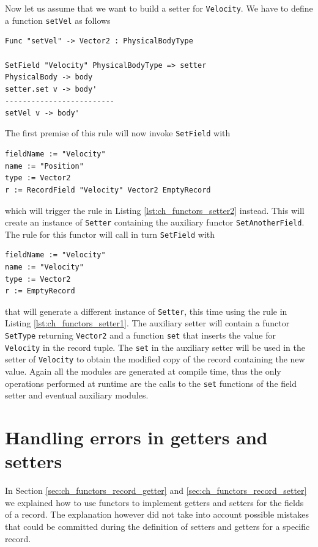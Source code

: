 \noindent
Now let us assume that we want to build a setter for \texttt{Velocity}. We have to define a function \texttt{setVel} as follows

\begin{lstlisting}
Func "setVel" -> Vector2 : PhysicalBodyType

SetField "Velocity" PhysicalBodyType => setter
PhysicalBody -> body
setter.set v -> body'
-------------------------
setVel v -> body'
\end{lstlisting}

\noindent
The first premise of this rule will now invoke \texttt{SetField} with

\begin{lstlisting}
fieldName := "Velocity"
name := "Position"
type := Vector2
r := RecordField "Velocity" Vector2 EmptyRecord
\end{lstlisting}

\noindent
which will trigger the rule in Listing \ref{lst:ch_functors_setter2} instead. This will create an instance of \texttt{Setter} containing  the auxiliary functor \texttt{SetAnotherField}. The rule for this functor will call in turn \texttt{SetField} with

\begin{lstlisting}
fieldName := "Velocity"
name := "Velocity"
type := Vector2
r := EmptyRecord
\end{lstlisting}

\noindent
that will generate a different instance of \texttt{Setter}, this time using the rule in Listing \ref{lst:ch_functors_setter1}. The auxiliary setter will contain a functor \texttt{SetType} returning \texttt{Vector2} and a function \texttt{set} that inserts the value for \texttt{Velocity} in the record tuple. The \texttt{set} in the auxiliary setter will be used in the setter of \texttt{Velocity} to obtain the modified copy of the record containing the new value. Again all the modules are generated at compile time, thus the only operations performed at runtime are the calls to the \texttt{set} functions of the field setter and eventual auxiliary modules.

\section{Handling errors in getters and setters}
\label{sec:ch_functors_error_handling}
In Section \ref{sec:ch_functors_record_getter} and \ref{sec:ch_functors_record_setter} we explained how to use functors to implement getters and setters for the fields of a record. The explanation however did not take into account possible mistakes that could be committed during the definition of setters and getters for a specific record.

